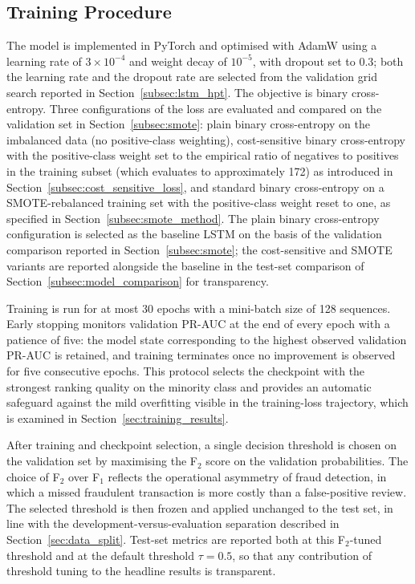 \documentclass[oneside,12pt,parskip=half,american,numbers=noenddot]{scrreprt}
\begin{document}
\subsection{Training Procedure}
\label{subsec:lstm_train}

The model is implemented in PyTorch and optimised with AdamW using a learning rate of $3\times 10^{-4}$ and weight decay of $10^{-5}$, with dropout set to $0.3$; both the learning rate and the dropout rate are selected from the validation grid search reported in Section~\ref{subsec:lstm_hpt}. The objective is binary cross-entropy. Three configurations of the loss are evaluated and compared on the validation set in Section~\ref{subsec:smote}: plain binary cross-entropy on the imbalanced data (no positive-class weighting), cost-sensitive binary cross-entropy with the positive-class weight set to the empirical ratio of negatives to positives in the training subset (which evaluates to approximately 172) as introduced in Section~\ref{subsec:cost_sensitive_loss}, and standard binary cross-entropy on a SMOTE-rebalanced training set with the positive-class weight reset to one, as specified in Section~\ref{subsec:smote_method}. The plain binary cross-entropy configuration is selected as the baseline LSTM on the basis of the validation comparison reported in Section~\ref{subsec:smote}; the cost-sensitive and SMOTE variants are reported alongside the baseline in the test-set comparison of Section~\ref{subsec:model_comparison} for transparency.

Training is run for at most 30 epochs with a mini-batch size of 128 sequences. Early stopping monitors validation PR-AUC at the end of every epoch with a patience of five: the model state corresponding to the highest observed validation PR-AUC is retained, and training terminates once no improvement is observed for five consecutive epochs. This protocol selects the checkpoint with the strongest ranking quality on the minority class and provides an automatic safeguard against the mild overfitting visible in the training-loss trajectory, which is examined in Section~\ref{sec:training_results}.

After training and checkpoint selection, a single decision threshold is chosen on the validation set by maximising the F$_2$ score on the validation probabilities. The choice of F$_2$ over F$_1$ reflects the operational asymmetry of fraud detection, in which a missed fraudulent transaction is more costly than a false-positive review. The selected threshold is then frozen and applied unchanged to the test set, in line with the development-versus-evaluation separation described in Section~\ref{sec:data_split}. Test-set metrics are reported both at this F$_2$-tuned threshold and at the default threshold $\tau = 0.5$, so that any contribution of threshold tuning to the headline results is transparent.
\end{document}

